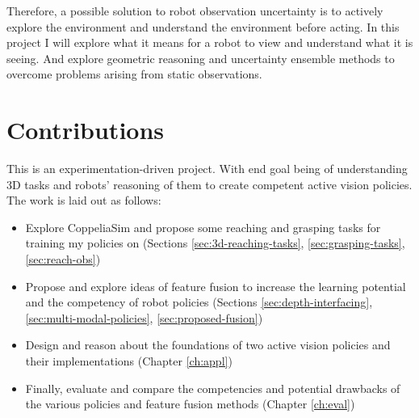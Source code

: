   Therefore, a possible solution to robot observation uncertainty is to actively explore the environment and understand the environment before acting. In this project I will explore what it means for a robot to view and understand what it is seeing. And explore geometric reasoning and uncertainty ensemble methods to overcome problems arising from static observations.


\section{Contributions}
  This is an experimentation-driven project. With end goal being of understanding 3D tasks and robots' reasoning of them to create competent active vision policies. The work is laid out as follows:

  \begin{itemize}
    \item Explore CoppeliaSim and propose some reaching and grasping tasks for training my policies on (Sections \ref{sec:3d-reaching-tasks}, \ref{sec:grasping-tasks}, \ref{sec:reach-obs})
    \item Propose and explore ideas of feature fusion to increase the learning potential and the competency of robot policies (Sections \ref{sec:depth-interfacing}, \ref{sec:multi-modal-policies}, \ref{sec:proposed-fusion})
    \item Design and reason about the foundations of two active vision policies and their implementations (Chapter \ref{ch:appl})
    \item Finally, evaluate and compare the competencies and potential drawbacks of the various policies and feature fusion methods (Chapter \ref{ch:eval})
  \end{itemize}

